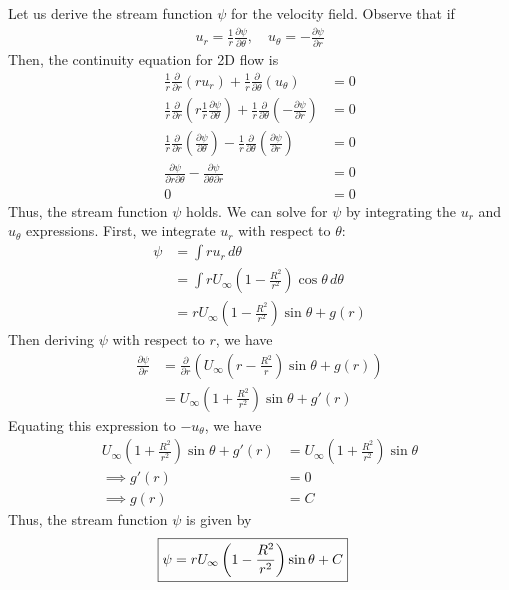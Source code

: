 \subsection{}
Let us derive the stream function $\psi$ for the velocity field. Observe that if 
\begin{align*}
    u_r = \frac{1}{r} \frac{\partial \psi}{\partial \theta}, \quad u_{\theta} = -\frac{\partial \psi}{\partial r}
\end{align*}
Then, the continuity equation for 2D flow is
\begin{align*}
    \frac{1}{r} \frac{\partial}{\partial r}(r u_r) + \frac{1}{r}\frac{\partial}{\partial \theta}(u_{\theta}) &= 0 \\
    \frac{1}{r} \frac{\partial}{\partial r}\left(r \frac{1}{r} \frac{\partial \psi}{\partial \theta}\right) + \frac{1}{r}\frac{\partial}{\partial \theta}\left(-\frac{\partial \psi}{\partial r}\right) &= 0 \\
    \frac{1}{r} \frac{\partial}{\partial r}\left(\frac{\partial \psi}{\partial \theta}\right) - \frac{1}{r}\frac{\partial}{\partial \theta}\left(\frac{\partial \psi}{\partial r}\right) &= 0 \\
    \frac{\partial \psi}{\partial r \partial \theta} - \frac{\partial \psi}{\partial \theta \partial r} &= 0 \\
    0&=0
\end{align*}
Thus, the stream function $\psi$ holds. We can solve for $\psi$ by integrating the $u_r$ and $u_{\theta}$ expressions. First, we integrate $u_r$ with respect to $\theta$:
\begin{align*}
    \psi &= \int r u_r \, d\theta \\
    &= \int r U_{\infty} \left(1 - \frac{R^2}{r^2}\right)\cos\theta \, d\theta \\
    &= rU_{\infty}\left(1 - \frac{R^2}{r^2}\right)\sin\theta + g(r)
\end{align*}
Then deriving $\psi$ with respect to $r$, we have
\begin{align*}
    \frac{\partial \psi}{\partial r} &= \frac{\partial}{\partial r}\left(U_{\infty}\left(r - \frac{R^2}{r}\right)\sin\theta + g(r)\right) \\
    &= U_{\infty}\left(1 + \frac{R^2}{r^2}\right)\sin\theta + g'(r)
\end{align*}
Equating this expression to $-u_{\theta}$, we have
\begin{align*}
    U_{\infty}\left(1 + \frac{R^2}{r^2}\right)\sin\theta + g'(r) &= U_{\infty} \left(1 + \frac{R^2}{r^2}\right)\sin\theta \\
    \implies g'(r) &= 0 \\
    \implies g(r) &= C
\end{align*}
Thus, the stream function $\psi$ is given by
\begin{align*}
    \Aboxed{\psi &= rU_{\infty}\left(1 - \frac{R^2}{r^2}\right)\sin\theta + C}
\end{align*}